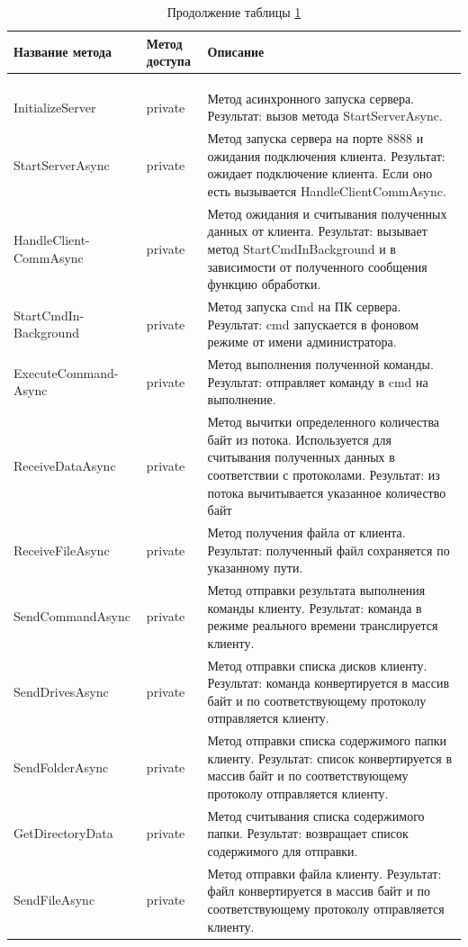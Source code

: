\begin{longtable}[l]{|p{4.25cm}|p{2.35cm}|p{8.1cm}|}
	\caption{Описание методов класса Server\label{class:tableServer}}\\
	\hline \centrow Название метода & \centrow Метод
	доступа & \centrow Описание \\
	\hline \centrow 1 & \centrow 2 & \centrow 3\\
	\endfirsthead
	\caption*{Продолжение таблицы \ref{class:tableServer}}\\
	\hline \centrow 1 & \centrow 2 & \centrow 3\\
	\finishhead
	\hline InitializeServer & private & Метод асинхронного запуска сервера.
	Результат: вызов метода StartServerAsync.\\
	\hline StartServerAsync & private & Метод запуска сервера на порте 8888 и ожидания подключения клиента.
	Результат: ожидает подключение клиента. Если оно есть вызывается HandleClientCommAsync.\\
	\hline HandleClient-
	CommAsync & private & Метод ожидания и считывания полученных данных от клиента.
	Результат: вызывает метод StartCmdInBackground и в зависимости от полученного сообщения функцию обработки.\\
	\hline StartCmdIn-
	Background & private & Метод запуска сmd на ПК сервера.
	Результат: cmd запускается в фоновом режиме от имени администратора. \\
	\hline ExecuteCommand-
	Async & private & Метод выполнения полученной команды.
	Результат: отправляет команду в cmd на выполнение.\\
	\hline ReceiveDataAsync & private & Метод вычитки определенного количества байт из потока. Используется для считывания полученных данных в соответствии с протоколами.
	Результат: из потока вычитывается указанное количество байт\\
	\hline ReceiveFileAsync & private & Метод получения файла от клиента.
	Результат: полученный файл сохраняется по указанному пути. \\
	\hline SendCommandAsync & private & Метод отправки результата выполнения команды клиенту.
	Результат: команда в режиме реального времени транслируется клиенту.\\
	\hline SendDrivesAsync & private &  Метод отправки списка дисков клиенту.
	Результат: команда конвертируется в массив байт и по соответствующему протоколу отправляется клиенту.\\
	\hline SendFolderAsync & private & Метод отправки списка содержимого папки клиенту.
	Результат: список конвертируется в массив байт и по соответствующему протоколу отправляется клиенту.\\
	\hline GetDirectoryData & private & Метод считывания списка содержимого папки.
	Результат: возвращает список содержимого для отправки.\\
	\hline SendFileAsync & private & Метод отправки файла клиенту.
	Результат: файл конвертируется в массив байт и по соответствующему протоколу отправляется клиенту.
\end{longtable}
\vspace{-\tablebelowskip}

